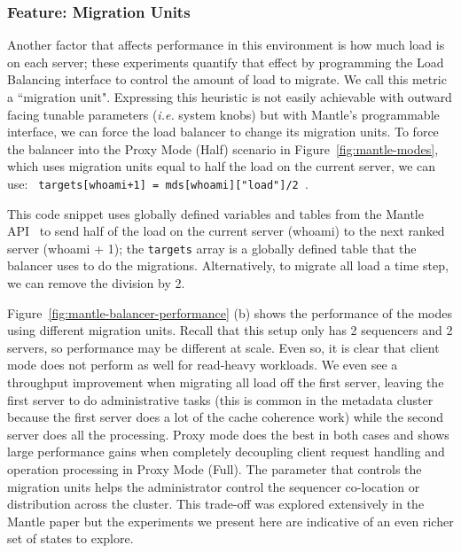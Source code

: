 \subsubsection{Feature: Migration Units}
\label{sec:feature-migration-units}

Another factor that affects performance in this environment is how much load is
on each server; these experiments quantify that effect by programming the Load
Balancing interface to control the amount of load to migrate. We call this
metric a ``migration unit".  Expressing this heuristic is not easily achievable
with outward facing tunable parameters ({\it i.e.} system knobs) but with Mantle's
programmable interface, we can force the load balancer to change its migration
units. To force the balancer into the Proxy Mode (Half) scenario in
Figure~\ref{fig:mantle-modes}, which uses migration units equal to half the
load on the current server, we can use: \texttt{ targets[whoami+1] =
mds[whoami]["load"]/2 }.

This code snippet uses globally defined variables and tables from the Mantle
API~\cite{sevilla:sc15-mantle} to send half of the load on the current server (whoami) to the next ranked
server (whoami + 1); the \texttt{targets} array is a globally defined table
that the balancer uses to do the migrations. Alternatively, to migrate all load
a time step, we can remove the division by 2.


Figure~\ref{fig:mantle-balancer-performance} (b) shows the performance of the
modes using different migration units. Recall that this setup only has 2
sequencers and 2 servers, so performance may be different at scale. Even so, it
is clear that client mode does not perform as well for read-heavy workloads. We
even see a throughput improvement when migrating all load off the first server,
leaving the first server to do administrative tasks (this is common in the
metadata cluster because the first server does a lot of the cache coherence
work) while the second server does all the processing. Proxy mode does the
best in both cases and shows large performance gains when completely decoupling
client request handling and operation processing in Proxy Mode (Full).  The
parameter that controls the migration units helps the administrator control the
sequencer co-location or distribution across the cluster. This trade-off was
explored extensively in the Mantle paper but the experiments we present here
are indicative of an even richer set of states to explore.

